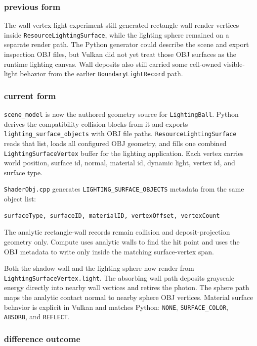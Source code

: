 \subsubsection{previous form}

The wall vertex-light experiment still generated rectangle wall render
vertices inside \texttt{ResourceLightingSurface}, while the lighting sphere
remained on a separate render path.  The Python generator could describe the
scene and export inspection OBJ files, but Vulkan did not yet treat those OBJ
surfaces as the runtime lighting canvas.  Wall deposits also still carried
some cell-owned visible-light behavior from the earlier
\texttt{BoundaryLightRecord} path.

\subsubsection{current form}

\texttt{scene\_model} is now the authored geometry source for
\texttt{LightingBall}.  Python derives the compatibility collision blocks
from it and exports \texttt{lighting\_surface\_objects} with OBJ file paths.
\texttt{ResourceLightingSurface} reads that list, loads all configured OBJ
geometry, and fills one combined \texttt{LightingSurfaceVertex} buffer for
the lighting application.  Each vertex carries world position, surface id,
normal, material id, dynamic light, vertex id, and surface type.

\texttt{ShaderObj.cpp} generates \texttt{LIGHTING\_SURFACE\_OBJECTS}
metadata from the same object list:
\begin{verbatim}
surfaceType, surfaceID, materialID, vertexOffset, vertexCount
\end{verbatim}
The analytic rectangle-wall records remain collision and deposit-projection
geometry only.  Compute uses analytic walls to find the hit point and uses
the OBJ metadata to write only inside the matching surface-vertex span.

Both the shadow wall and the lighting sphere now render from
\texttt{LightingSurfaceVertex.light}.  The absorbing wall path deposits
grayscale energy directly into nearby wall vertices and retires the photon.
The sphere path maps the analytic contact normal to nearby sphere OBJ
vertices.  Material surface behavior is explicit in Vulkan and matches
Python:
\texttt{NONE}, \texttt{SURFACE\_COLOR}, \texttt{ABSORB}, and
\texttt{REFLECT}.

\subsubsection{difference outcome}

